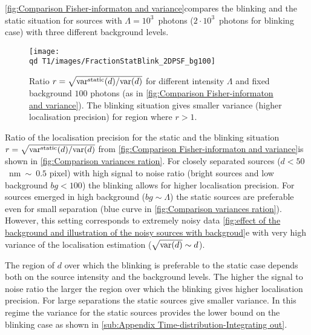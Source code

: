 \autoref{fig:Comparison Fisher-informaton and variance}\bbb compares the blinking and the static situation for sources with $\Lambda=10^3$~photons ($2\cdot10^3$~photons for blinking case) with three different background levels.

\begin{figure}%
	\centering	
	\texttt{[image: \\qd T1/images/FractionStatBlink\_2DPSF\_bg100]}	
	\caption{Ratio $r=\sqrt{\mathrm{var}^{\text{static}}(d)/\mathrm{var}(d)}$ for
	different intensity $\Lambda$ and fixed background $100$ photons
	(as in \autoref{fig:Comparison Fisher-informaton and variance}\aaa).
	The blinking situation gives smaller variance (higher localisation
	precision) for region where $r>1$. 
	\label{fig:Comparison variances ration} }
\end{figure}

Ratio of the localisation precision for the static and the blinking situation $r=\sqrt{\mathrm{var}^{\text{static}}(d)/\mathrm{var}(d)}$ from \autoref{fig:Comparison Fisher-informaton and variance}\aaa is shown in \autoref{fig:Comparison variances ration}. For closely separated sources ($d<50$~nm$\ \sim\ 0.5$ pixel) with high signal to noise ratio (bright sources and low background $bg<100$) the blinking allows for higher localisation precision. For sources emerged in high background ($bg\sim\Lambda$) the static sources are preferable even for small separation (blue curve in \autoref{fig:Comparison variances ration}). However, this setting corresponds to extremely noisy data \autoref{fig:effect of the background and illustration of the noisy sources with backgroud}e with very high variance of the localisation estimation ($\sqrt{\mathrm{var}(d)}\sim d$). 

The region of $d$ over which the blinking is preferable to the static case depends both on the source intensity and the background levels. The higher the signal to noise ratio the larger the region over which the blinking gives higher localisation precision. For large separations the static sources give smaller variance. In this regime the variance for the static sources provides the lower bound on the blinking case as shown in \autoref{sub:Appendix Time-distribution-Integrating out}.


